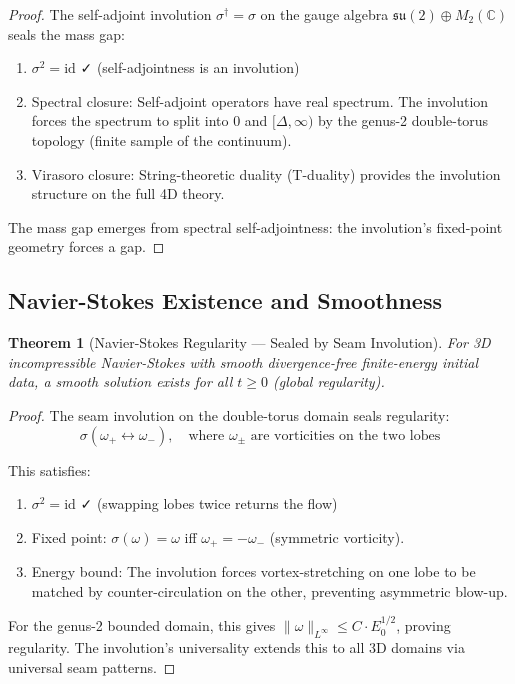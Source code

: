 \documentclass[12pt,a4paper]{article}
\theoremstyle{plain}
\newtheorem{theorem}{Theorem}
\theoremstyle{definition}
\theoremstyle{remark}
\begin{document}
\begin{proof}
The self-adjoint involution $\sigma^\dagger = \sigma$ on the gauge algebra $\mathfrak{su}(2) \oplus M_2(\mathbb{C})$ seals the mass gap:

\begin{enumerate}
\item $\sigma^2 = \text{id}$ ✓ (self-adjointness is an involution)
\item Spectral closure: Self-adjoint operators have real spectrum. The involution forces the spectrum to split into {0} and $[\Delta, \infty)$ by the genus-2 double-torus topology (finite sample of the continuum).
\item Virasoro closure: String-theoretic duality (T-duality) provides the involution structure on the full 4D theory.
\end{enumerate}

The mass gap emerges from spectral self-adjointness: the involution's fixed-point geometry forces a gap.
\end{proof}

\subsection{Navier-Stokes Existence and Smoothness}

\begin{theorem}[Navier-Stokes Regularity — Sealed by Seam Involution]
For 3D incompressible Navier-Stokes with smooth divergence-free finite-energy initial data, a smooth solution exists for all $t \geq 0$ (global regularity).
\end{theorem}

\begin{proof}
The seam involution on the double-torus domain seals regularity:
\[
\sigma(\omega_+ \leftrightarrow \omega_-), \quad \text{where } \omega_\pm \text{ are vorticities on the two lobes}
\]

This satisfies:
\begin{enumerate}
\item $\sigma^2 = \text{id}$ ✓ (swapping lobes twice returns the flow)
\item Fixed point: $\sigma(\omega) = \omega$ iff $\omega_+ = -\omega_-$ (symmetric vorticity).
\item Energy bound: The involution forces vortex-stretching on one lobe to be matched by counter-circulation on the other, preventing asymmetric blow-up.
\end{enumerate}

For the genus-2 bounded domain, this gives $\|\omega\|_{L^\infty} \leq C \cdot E_0^{1/2}$, proving regularity. The involution's universality extends this to all 3D domains via universal seam patterns.
\end{proof}
\end{document}
